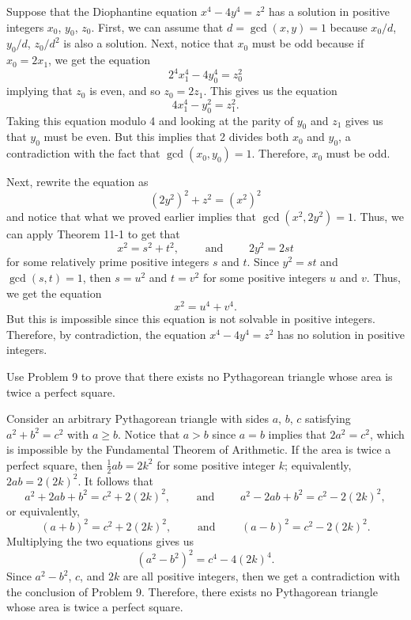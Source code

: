 \begin{solution}
    Suppose that the Diophantine equation $x^4 - 4y^4 = z^2$ has a solution in positive integers $x_0$, $y_0$, $z_0$. First, we can assume that $d = \gcd(x,y) = 1$ because $x_0/d$, $y_0/d$, $z_0/d^2$ is also a solution. Next, notice that $x_0$ must be odd because if $x_0 = 2x_1$, we get the equation
    $$2^4x_1^4 - 4y_0^4 = z_0^2$$
    implying that $z_0$ is even, and so $z_0 = 2z_1$. This gives us the equation
    $$4x_1^4 - y_0^2 = z_1^2.$$
    Taking this equation modulo 4 and looking at the parity of $y_0$ and $z_1$ gives us that $y_0$ must be even. But this implies that 2 divides both $x_0$ and $y_0$, a contradiction with the fact that $\gcd(x_0,y_0) = 1$. Therefore, $x_0$ must be odd.
    
    Next, rewrite the equation as
    $$(2y^2)^2 + z^2 = (x^2)^2$$
    and notice that what we proved earlier implies that $\gcd(x^2, 2y^2) = 1$. Thus, we can apply Theorem 11-1 to get that
    $$x^2 = s^2 + t^2, \qquad \text{ and } \qquad 2y^2 = 2st$$
    for some relatively prime positive integers $s$ and $t$. Since $y^2 = st$ and $\gcd(s,t) = 1$, then $s = u^2$ and $t = v^2$ for some positive integers $u$ and $v$. Thus, we get the equation
    $$x^2 = u^4 + v^4.$$
    But this is impossible since this equation is not solvable in positive integers. Therefore, by contradiction, the equation $x^4 - 4y^4 = z^2$ has no solution in positive integers. \\
\end{solution}

\begin{exercise}
    Use Problem 9 to prove that there exists no Pythagorean triangle whose area is twice a perfect square.  \\
\end{exercise}

\begin{solution}
    Consider an arbitrary Pythagorean triangle with sides $a$, $b$, $c$ satisfying $a^2 + b^2 = c^2$ with $a \geq b$. Notice that $a > b$ since $a = b$ implies that $2a^2 = c^2$, which is impossible by the Fundamental Theorem of Arithmetic. If the area is twice a perfect square, then $\frac{1}{2}ab = 2k^2$ for some positive integer $k$; equivalently, $2ab = 2(2k)^2$. It follows that
    $$a^2 + 2ab + b^2 = c^2 + 2(2k)^2, \qquad \text{ and } \qquad a^2 - 2ab + b^2 = c^2 - 2(2k)^2,$$
    or equivalently,
    $$(a+b)^2 = c^2 + 2(2k)^2, \qquad \text{ and } \qquad (a-b)^2 = c^2 - 2(2k)^2.$$
    Multiplying the two equations gives us
    $$(a^2 - b^2)^2 = c^4 - 4(2k)^4.$$
    Since $a^2 - b^2$, $c$, and $2k$ are all positive integers, then we get a contradiction with the conclusion of Problem 9. Therefore, there exists no Pythagorean triangle whose area is twice a perfect square. \\
\end{solution}

